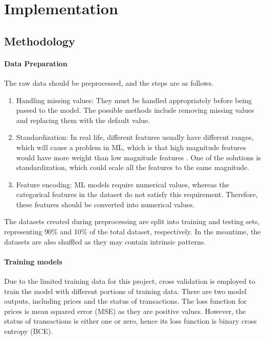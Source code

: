 \documentclass[12pt,twoside]{report}
\begin{document}
\chapter{Implementation}

\section{Methodology}
\subsubsection{Data Preparation}
The raw data should be preprocessed, and the steps are as follows. 
\begin{enumerate}
	\item Handling missing values: They must be handled appropriately before being passed to the model. The possible methods include removing missing values and replacing them with the default value.
	\item Standardization: In real life, different features usually have different ranges, which will cause a problem in ML, which is that high magnitude features would have more weight than low magnitude features \citep{RN4}. One of the solutions is standardization, which could scale all the features to the same magnitude.
	\item Feature encoding: ML models require numerical values, whereas the categorical features in the dataset do not satisfy this requirement. Therefore, these features should be converted into numerical values.
\end{enumerate}

The datasets created during preprocessing are split into training and testing sets, representing 90\% and 10\% of the total dataset, respectively. In the meantime, the datasets are also shuffled as they may contain intrinsic patterns.

\subsubsection{Training models}
Due to the limited training data for this project, cross validation is employed to train the model with different portions of training data. There are two model outputs, including prices and the status of transactions. The loss function for prices is mean squared error (MSE) as they are positive values. However, the status of transactions is either one or zero, hence its loss function is binary cross entropy (BCE). 
\\
\end{document}
